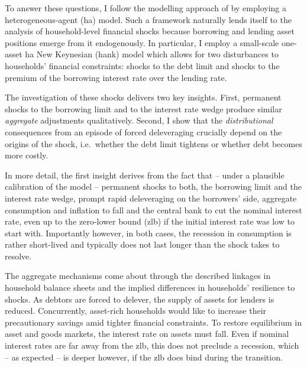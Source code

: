 \documentclass[12pt]{article} %
\numberwithin{equation}{section} %
\numberwithin{figure}{section}
\numberwithin{table}{section}
\begin{document}
To answer these questions, I follow the modelling approach of \textcite{gl2017} by employing a heterogeneous-agent (\Gls{ha}) model. Such a framework naturally lends itself to the analysis of household-level financial shocks because borrowing and lending asset positions emerge from it endogenously. In particular, I employ a small-scale one-asset \Gls{ha} New Keynesian (\Gls{hank}) model which allows for two disturbances to households' financial constraints: shocks to the debt limit and shocks to the premium of the borrowing interest rate over the lending rate.


The investigation of these shocks delivers two key insights. First, permanent shocks to the borrowing limit and to the interest rate wedge produce similar \textit{aggregate} adjustments qualitatively. Second, I show that the \textit{distributional} consequences from an episode of forced deleveraging crucially depend on the origins of the shock, i.e.~whether the debt limit tightens or whether debt becomes more costly.

In more detail, the first insight derives from the fact that -- under a plausible calibration of the model -- permanent shocks to both, the borrowing limit and the interest rate wedge, prompt rapid deleveraging on the borrowers' side, aggregate consumption and inflation to fall and the central bank to cut the nominal interest rate, even up to the zero-lower bound (\Gls{zlb}) if the initial interest rate was low to start with. Importantly however, in both cases, the recession in consumption is rather short-lived and typically does not last longer than the shock takes to resolve. %

The aggregate mechanisms come about through the described linkages in household balance sheets and the implied differences in households' resilience to shocks. As debtors are forced to delever, the supply of assets for lenders is reduced. Concurrently, asset-rich households would like to increase their precautionary savings amid tighter financial constraints. To restore equilibrium in asset and goods markets, the interest rate on assets must fall. Even if nominal interest rates are far away from the \Gls{zlb}, this does not preclude a recession, which -- as expected -- is deeper however, if the \Gls{zlb} does bind during the transition. 
\end{document}
